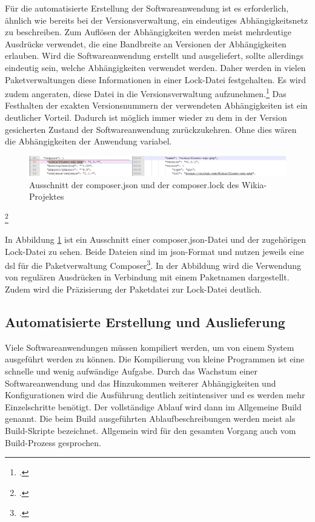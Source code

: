 Für die automatisierte Erstellung der Softwareanwendung ist es erforderlich, ähnlich wie bereits bei der Versionsverwaltung, ein eindeutiges Abhängigkeitsnetz zu beschreiben. Zum Auflösen der Abhängigkeiten werden meist mehrdeutige Ausdrücke verwendet, die eine Bandbreite an Versionen der Abhängigkeiten erlauben. Wird die Softwareanwendung erstellt und ausgeliefert, sollte allerdings eindeutig sein, welche Abhängigkeiten verwendet werden. Daher werden in 
vielen Paketverwaltungen diese Informationen in einer Lock-Datei festgehalten. Es wird zudem angeraten, diese Datei in die Versionsverwaltung aufzunehmen.\footcite[vgl.][]{composer-why-lock-in-vcs} Das Festhalten der exakten Versionsnummern der verwendeten Abhängigkeiten ist ein deutlicher Vorteil. Dadurch ist möglich immer wieder zu dem in der Version gesicherten Zustand der Softwareanwendung zurückzukehren. Ohne dies wären die Abhängigkeiten der Anwendung variabel.

\begin{figure}[htbp]
  \includegraphics[width=\textwidth, height=\textheight, keepaspectratio]
  {resources/dependency-mgmg-composer-wikia.pdf}
  \caption{Ausschnitt der composer.json und der composer.lock des Wikia-Projektes\protect\footnotemark}
  \label{dependency-mgmg-composer-wikia}
\end{figure}
\footcitetext[vgl.][composer.json]{wikia-github}

In Abbildung \ref{dependency-mgmg-composer-wikia} ist ein Ausschnitt einer \glqq composer.json\grqq{}-Datei und der zugehörigen Lock-Datei zu sehen. Beide Dateien sind im \acs{json}-Format und nutzen jeweils eine \acs{dsl} für die Paketverwaltung Composer\footcite{composer-json}. In der Abbildung wird die Verwendung von regulären Ausdrücken in Verbindung mit einem Paketnamen dargestellt. Zudem wird die Präzisierung der Paketdatei zur Lock-Datei deutlich.

\subsection{Automatisierte Erstellung und Auslieferung}

Viele Softwareanwendungen müssen kompiliert werden, um von einem System ausgeführt werden zu können. Die Kompilierung von kleine Programmen ist eine schnelle und wenig aufwändige Aufgabe. Durch das Wachstum einer Softwareanwendung und das Hinzukommen weiterer Abhängigkeiten und Konfigurationen wird die Ausführung deutlich zeitintensiver und es werden mehr Einzelschritte benötigt. Der vollständige Ablauf wird dann im Allgemeine \glqq Build\grqq{} genannt. Die beim Build ausgeführten Ablaufbeschreibungen werden meist als Build-Skripte bezeichnet. Allgemein wird für den gesamten Vorgang auch vom Build-Prozess gesprochen.

